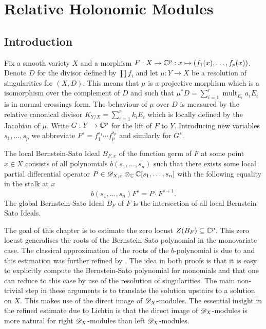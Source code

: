 \chapter{Relative Holonomic Modules}
\section{Introduction}\label{sec: IntoductionChapterRelative}
Fix a smooth variety $X$ and a morphism $F:X\to \mathbb{C}^p: x \mapsto (f_1(x), \ldots, f_p(x))$. Denote $D$ for the divisor defined by $\prod f_i$ and let $\mu:Y\to X$ be a resolution of singularities for $(X,D)$.
This means that $\mu$ is a projective morphism which is a isomorphism over the complement of $D$ and such that $\mu^*D = \sum_{i=1}^r \operatorname{mult}_{E_i} a_i E_i$ is in normal crossings form.
The behaviour of $\mu$ over $D$ is measured by the relative canonical divisor $K_{Y/X} = \sum_{i=1}^r k_i E_i$ which is locally defined by the Jacobian of $\mu$.
Write $G:Y\to \mathbb{C}^p$ for the lift of $F$ to $Y$.
Introducing new variables $s_1,\ldots,s_p$ we abbreviate $F^s= f_1^{s_1} \cdots f_p^{s_p}$ and similarly for $G^s$.


The local Bernstein-Sato Ideal $B_{F,x}$ of the function germ of $F$ at some point $x\in X$ consists of all polynomials $b(s_1,\ldots, s_n)$ such that there exists some local partial differential operator $P\in \mathscr{D}_{X,x}\otimes_{\mathbb{C}} \mathbb{C}[s_1,\ldots,s_n]$ with the following equality in the stalk at $x$
$$b(s_1,\ldots, s_n) F^s = P\cdot F^{s+1}.$$
The global Bernstein-Sato Ideal $B_F$ of $F$ is the intersection of all local Bernstein-Sato Ideals.

The goal of this chapter is to estimate the zero locust $Z(B_{F})\subseteq \mathbb{C}^p$.
This zero locust generalises the roots of the Bernstein-Sato polynomial in the monovariate case.
The classical approximation of the roots of the $b$-polynomial is due to \cite{kashiwara1976b} and this estimation was further refined by \cite{lichtin1989poles}.
The idea in both proofs is that it is easy to explicitly compute the Bernstein-Sato polynomial for monomials and that one can reduce to this case by use of the resolution of singularities.
The main non-trivial step in these arguments is to translate the solution upstairs to a solution on $X$.
This makes use of the direct image of $\mathscr{D}_X$-modules.
The essential insight in the refined estimate due to Lichtin is that the direct image of $\mathscr{D}_X$-modules is more natural for right $\mathscr{D}_X$-modules than left $\mathscr{D}_X$-modules.


